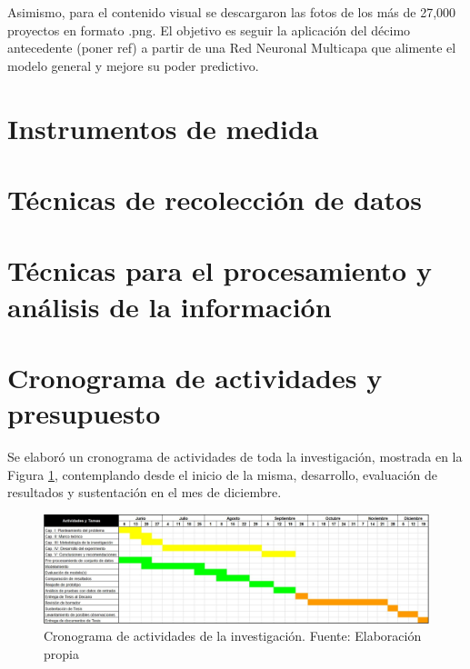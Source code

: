 Asimismo, para el contenido visual se descargaron las fotos de los más de 27,000 proyectos en formato .png. El objetivo es seguir la aplicación del décimo antecedente (poner ref) a partir de una Red Neuronal Multicapa que alimente el modelo general y mejore su poder predictivo.

\section{Instrumentos de medida}


\section{Técnicas de recolección de datos}


\section{Técnicas para el procesamiento y análisis de la información}



\section{Cronograma de actividades y presupuesto}
Se elaboró un cronograma de actividades de toda la investigación, mostrada en la Figura \ref{3:fig2}, contemplando desde el inicio de la misma, desarrollo, evaluación de resultados y sustentación en el mes de diciembre.
\begin{figure}[h]
	\begin{center}
		\includegraphics[width=1.1\textwidth]{3/figures/cronograma.jpg}
		\caption{Cronograma de actividades de la investigación. Fuente: Elaboración propia}
		\label{3:fig2}
	\end{center}
\end{figure}
